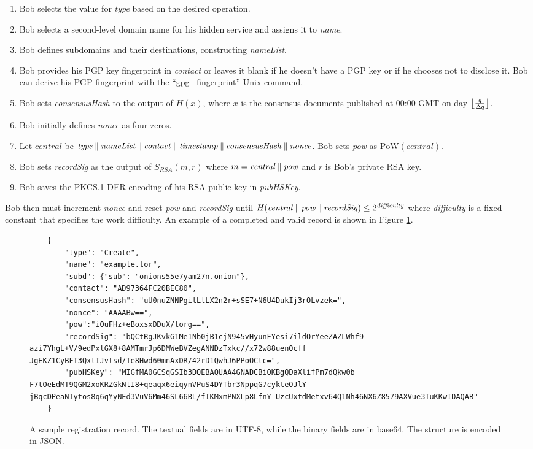 \begin{enumerate}
	\item Bob selects the value for \emph{type} based on the desired operation.
	\item Bob selects a second-level domain name for his hidden service and assigns it to \emph{name}.
	\item Bob defines subdomains and their destinations, constructing \emph{nameList}.
	\item Bob provides his PGP key fingerprint in \emph{contact} or leaves it blank if he doesn't have a PGP key or if he chooses not to disclose it. Bob can derive his PGP fingerprint with the ``gpg --fingerprint'' Unix command.
	\item Bob sets \emph{consensusHash} to the output of $ H(x) $, where $ x $ is the consensus documents published at 00:00 GMT on day $ \floor[\big]{\frac{q}{\Delta q}} $.
	\item Bob initially defines \emph{nonce} as four zeros.
	\item Let $ \mathit{central} $ be $\mathit{type} \concat \mathit{nameList} \concat \mathit{contact} \concat \mathit{timestamp} \concat \mathit{consensusHash} \concat \mathit{nonce} $. Bob sets \emph{pow} as $ \mathrm{PoW}(\mathit{central}) $.
	\item Bob sets \emph{recordSig} as the output of $ S_{\mathit{RSA}}(m, r) $ where $ m = \mathit{central} \concat \mathit{pow} $ and $ r $ is Bob's private RSA key.
	\item Bob saves the PKCS.1 DER encoding of his RSA public key in \emph{pubHSKey}.
\end{enumerate}

Bob then must increment \emph{nonce} and reset \emph{pow} and \emph{recordSig} until $ H(\mathit{central} \concat \mathit{pow} \concat \mathit{recordSig}) \leq 2^{\mathit{difficulty}} $ where \emph{difficulty} is a fixed constant that specifies the work difficulty. An example of a completed and valid record is shown in Figure \ref{fig:sampleRecord}.

\begin{figure}
\begin{lstlisting}
	{
		"type": "Create",
		"name": "example.tor",
		"subd": {"sub": "onions55e7yam27n.onion"},
		"contact": "AD97364FC20BEC80",
		"consensusHash": "uU0nuZNNPgilLlLX2n2r+sSE7+N6U4DukIj3rOLvzek=",
		"nonce": "AAAABw==",
		"pow":"iOuFHz+eBoxsxDDuX/torg==",
		"recordSig": "bQCtRgJKvkG1Me1Nb0jB1cjN945vHyunFYesi7ildOrYeeZAZLWhf9 azi7YhgL+V/9edPxlGX8+8AMTmrJp6DMWeBVZegANNDzTxkc//x72w88uenQcff JgEKZ1CyBFT3QxtIJvtsd/Te8Hwd60mnAxDR/42rD1QwhJ6PPoOCtc=",		
		"pubHSKey": "MIGfMA0GCSqGSIb3DQEBAQUAA4GNADCBiQKBgQDaXlifPm7dQkw0b F7tOeEdMT9QGM2xoKRZGkNtI8+qeaqx6eiqynVPuS4DYTbr3NppqG7cykteOJlY jBqcDPeaNIytos8q6qYyNEd3VuV6Mm46SL66BL/fIKMxmPNXLp8LfnY UzcUxtdMetxv64Q1Nh46NX6Z8579AXVue3TuKKwIDAQAB"
	}
	\end{lstlisting}
	\caption{A sample registration record. The textual fields are in UTF-8, while the binary fields are in base64. The structure is encoded in JSON.}
	\label{fig:sampleRecord}
\end{figure}

